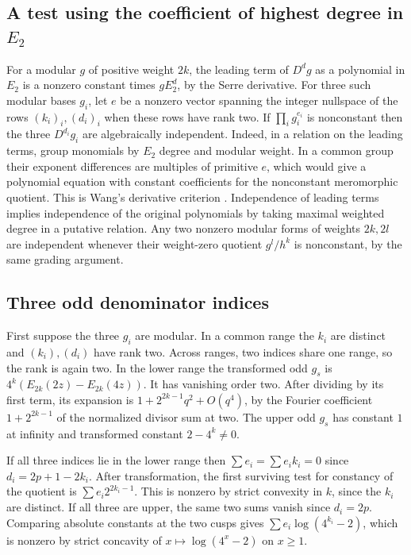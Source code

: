 \documentclass[11pt]{article}
\begin{document}
\subsection*{A test using the coefficient of highest degree in $E_2$}
For a modular $g$ of positive weight $2k$, the leading term of $D^d g$ as a polynomial in $E_2$ is a nonzero constant times $g E_2^d$, by the Serre derivative. For three such modular bases $g_i$, let $e$ be a nonzero vector spanning the integer nullspace of the rows $(k_i)_i,(d_i)_i$ when these rows have rank two. If $\prod_i g_i^{e_i}$ is nonconstant then the three $D^{d_i}g_i$ are algebraically independent. Indeed, in a relation on the leading terms, group monomials by $E_2$ degree and modular weight. In a common group their exponent differences are multiples of primitive $e$, which would give a polynomial equation with constant coefficients for the nonconstant meromorphic quotient. This is Wang's derivative criterion \cite[Proposition 5.5]{Wang2025}. Independence of leading terms implies independence of the original polynomials by taking maximal weighted degree in a putative relation. Any two nonzero modular forms of weights $2k,2l$ are independent whenever their weight-zero quotient $g^l/h^k$ is nonconstant, by the same grading argument.

\clearpage
\subsection*{Three odd denominator indices}
First suppose the three $g_i$ are modular. In a common range the $k_i$ are distinct and $(k_i),(d_i)$ have rank two. Across ranges, two indices share one range, so the rank is again two. In the lower range the transformed odd $g_s$ is $4^k(E_{2k}(2z)-E_{2k}(4z))$. It has vanishing order two. After dividing by its first term, its expansion is $1+2^{2k-1}q^2+O(q^4)$, by the Fourier coefficient $1+2^{2k-1}$ of the normalized divisor sum at two. The upper odd $g_s$ has constant $1$ at infinity and transformed constant $2-4^k\ne0$.

If all three indices lie in the lower range then $\sum e_i=\sum e_i k_i=0$ since $d_i=2p+1-2k_i$. After transformation, the first surviving test for constancy of the quotient is $\sum e_i2^{2k_i-1}$. This is nonzero by strict convexity in $k$, since the $k_i$ are distinct. If all three are upper, the same two sums vanish since $d_i=2p$. Comparing absolute constants at the two cusps gives $\sum e_i\log(4^{k_i}-2)$, which is nonzero by strict concavity of $x\mapsto\log(4^x-2)$ on $x\ge1$.
\end{document}
